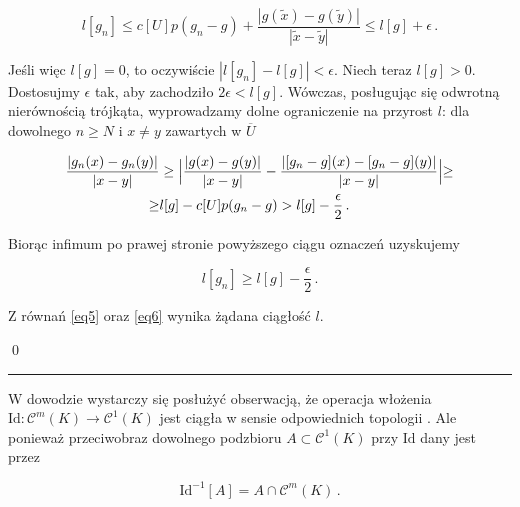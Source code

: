 \begin{equation}\label{eq5}
	l[g_n] \leq c[U]p(g_n - g) + \frac{|g(\tilde{x}) - g(\tilde{y})|}{|\tilde{x}-\tilde{y}|} \leq l[g] + \epsilon\,.
\end{equation}	
	
Jeśli więc $ l[g] = 0 $, to oczywiście $ |l[g_n] - l[g]| < \epsilon$. Niech teraz $ l[g] >0 $. Dostosujmy $ \epsilon $ tak, aby zachodziło $ 2\epsilon < l[g] $. Wówczas, posługując się odwrotną nierównością trójkąta, wyprowadzamy dolne ograniczenie na przyrost $ l $: dla dowolnego $ n \geq N $ i $ x \not= y $ zawartych w $ \overline{U} $

\begin{equation*}
\begin{split}
	\frac{|g_n (x) - g_n (y)|}{|x-y|} &\geq \Bigl | 	\frac{|g(x) - g(y)|}{|x-y|}	 - \frac{|[g_n-g] (x) - [g_n-g] (y)|}{|x-y|}  \Bigl | \geq \\ 
\geq & l[g] - c[U]p(g_n - g) > l[g] - \frac{\epsilon}{2}\,.\\
\end{split}	
\end{equation*}	
	
Biorąc infimum po prawej stronie powyższego ciągu oznaczeń uzyskujemy 	
	
\begin{equation}\label{eq6}
	l[g_n] \geq l[g] - \frac{\epsilon}{2}\,.
\end{equation}	
	
Z równań \ref{eq5} oraz \ref{eq6} wynika żądana ciągłość $ l $.
	

\qed
\newline


\hrule
\begin{dowod}\label{proof_openess_of_Y_0}
\end{dowod}

W dowodzie wystarczy się posłużyć obserwacją, że operacja włożenia $\mathrm{Id}:\mathcal{C}^{m}(K) \rightarrow \mathcal{C}^{1}(K)$ jest ciągła w sensie odpowiednich topologii \citet[][lemat 2.4, str. 460]{Lanza2}. Ale ponieważ przeciwobraz dowolnego podzbioru $A \subset \mathcal{C}^{1}(K)$ przy $\mathrm{Id}$ dany jest przez 

\begin{equation*}
	\mathrm{Id}^{-1}[A] = A \cap \mathcal{C}^{m}(K)\,.
\end{equation*}

